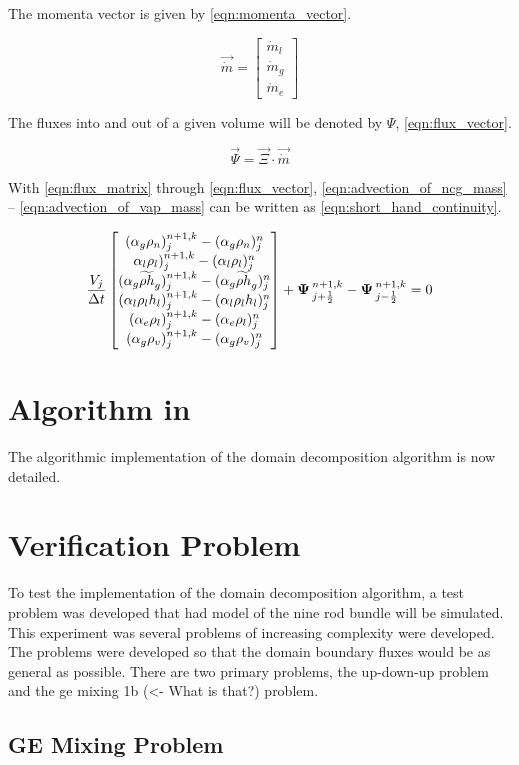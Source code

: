 The momenta vector is given by \eqref{eqn:momenta_vector}.

\begin{equation}
\label{eqn:momenta_vector}
\vec{\dot{m}} = \begin{bmatrix}
\dot{m}_{l} \\
\dot{m}_{g} \\
\dot{m}_{e}
\end{bmatrix}
\end{equation}

The fluxes into and out of a given volume will be denoted by $\Psi$, \eqref{eqn:flux_vector}.

\begin{equation}
\label{eqn:flux_vector}
\vec{\Psi} = \vec{\Xi} \cdot \vec{\dot{m}}
\end{equation}


With \eqref{eqn:flux_matrix} through \eqref{eqn:flux_vector}, \eqref{eqn:advection_of_ncg_mass} -- \eqref{eqn:advection_of_vap_mass} can be written as \eqref{eqn:short_hand_continuity}.

\begin{equation}
\label{eqn:short_hand_continuity}
\frac{V_j}{\dt} \begin{bmatrix}
(\alpha_{g} \rho_{n})^{n+1, k}_{j} - (\alpha_{g} \rho_{n})^{n}_{j} \\
\alpha_{l} \rho_{l})^{n+1, k}_{j} - (\alpha_{l} \rho_{l})^{n}_{j} \\
(\alpha_{g} \widetilde{\rho h}_{g})^{n+1, k}_{j} - (\alpha_{g} \widetilde{\rho h}_{g})^{n}_{j}  \\
(\alpha_{l} \rho_{l} h_{l})^{n+1, k}_{j} - (\alpha_{l} \rho_{l} h_{l} )^{n}_{j} \\
(\alpha_{e} \rho_{l})^{n+1, k}_{j} - (\alpha_{e} \rho_{l})^{n}_{j} \\
(\alpha_{g} \rho_{v})^{n+1, k}_{j} - (\alpha_{g} \rho_{v})^{n}_{j} 
\end{bmatrix} + \vec{\Psi}^{n+1, k}_{j + \frac{1}{2}} - \vec{\Psi}^{n+1, k}_{j - \frac{1}{2}}= 0
\end{equation}



\section{Algorithm in \cobra{}}
\label{sec:dd:algo}

The algorithmic implementation of the domain decomposition algorithm is now detailed.

\section{Verification Problem}
\label{sec:dd:verify}
To test the implementation of the domain decomposition algorithm, a test problem was developed that had model of the nine rod bundle will be simulated. 
This experiment was several problems of increasing complexity were developed.
The problems were developed so that the domain boundary fluxes would be as general as possible.
There are two primary problems, the up-down-up problem and the ge mixing 1b (<- What is that?) problem.

\subsection{GE Mixing Problem}
\label{ss:dd:ver:gem}




